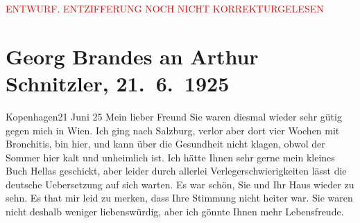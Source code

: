 
\begin{center}
            \textcolor{red}{ENTWURF. ENTZIFFERUNG NOCH NICHT KORREKTURGELESEN}
                      \end{center}
            
               \section[Georg Brandes an Arthur Schnitzler, 21. 6. 1925]{ Georg Brandes an Arthur Schnitzler, 21. 6. 1925}\nopagebreak{}\rehead{ }\begin{ledgroupsized}[t]{13cm}\normalsize\beginnumbering{} \toendnotes[C]{\smallbreak\pagebreak[2]} 
\toendnotes[C]{\smallbreak}\pstart
           \raggedleft{}{\pb}Kopenhagen21 Juni 25\pend
           \pstart{}Mein lieber Freund\pend\pstart
           Sie waren diesmal wieder sehr gütig gegen mich in Wien. Ich ging nach Salzburg, verlor
                    aber dort vier Wochen mit Bronchitis, bin hier, und kann über die Gesundheit
                    nicht klagen, obwol der Sommer hier kalt und unheimlich ist.\pend
           \pstart
           Ich hätte Ihnen sehr gerne mein kleines Buch Hellas geschickt, aber leider durch allerlei Verlegerschwierigkeiten
                    lässt die deutsche Uebersetzung auf sich warten.\pend
           \pstart
           Es war schön, Sie und Ihr Haus wieder zu sehn. Es that mir leid zu merken, dass
                    Ihre Stimmung nicht heiter war. Sie waren nicht deshalb weniger liebenswürdig,
                    aber ich gönnte {\pb}Ihnen mehr
                    Lebensfreude.\pend

\end{ledgroupsized}
